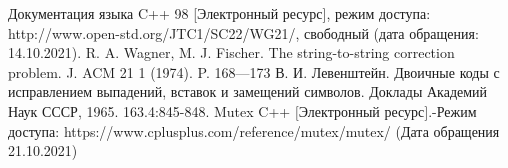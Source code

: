 \documentclass[12pt,a4paper]{report}
\begin{document}
\newpage
\renewcommand\bibname{Список литературы}
\makeatletter %
\def\@biblabel#1{#1. }
\makeatother
\begin{thebibliography}{4}
     Документация языка C++ 98 [Электронный ресурс], режим доступа: http://www.open-std.org/JTC1/SC22/WG21/, свободный (дата обращения: 14.10.2021).
     R. A. Wagner, M. J. Fischer. The string-to-string correction problem. J. ACM 21 1 (1974). P. 168—173
     В. И. Левенштейн. Двоичные коды с исправлением выпадений, вставок и замещений символов. Доклады Академий Наук СССР, 1965. 163.4:845-848.
     Mutex C++ $[$Электронный ресурс$]$.-Режим доступа: https://www.cplusplus.com/reference/mutex/mutex/ (Дата обращения 21.10.2021)
\end{thebibliography}
\end{document}
